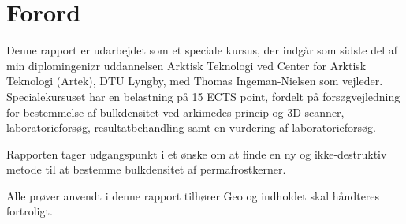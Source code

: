 \chapter{Forord}
Denne rapport er udarbejdet som et speciale kursus, der indgår som sidste del af min diplomingeniør uddannelsen Arktisk Teknologi ved Center for Arktisk Teknologi (Artek), DTU Lyngby, med Thomas Ingeman-Nielsen som vejleder. Specialekursuset har en belastning på 15 ECTS point, fordelt på forsøgvejledning for bestemmelse af bulkdensitet ved arkimedes princip og 3D scanner, laboratorieforsøg, resultatbehandling samt en vurdering af laboratorieforsøg.

\noindent Rapporten tager udgangspunkt i et ønske om at finde en ny og ikke-destruktiv metode til at bestemme bulkdensitet af permafrostkerner. 

\noindent Alle prøver anvendt i denne rapport tilhører Geo og indholdet skal håndteres fortroligt. 

